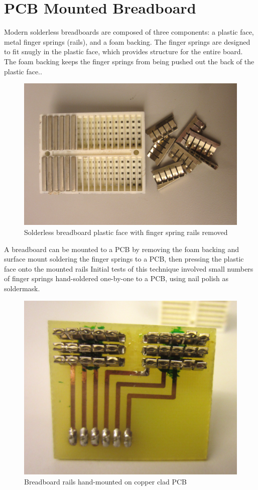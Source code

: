 \documentclass[11pt,twoside]{mitthesis}
\begin{document}
\section{PCB Mounted Breadboard}

Modern solderless breadboards are composed of three components: a plastic face, metal finger springs (rails), and a foam backing.
The finger springs are designed to fit snugly in the plastic face, which provides structure for the entire board.
The foam backing keeps the finger springs from being pushed out the back of the plastic face..

\begin{figure}[h!]
  \begin{center}
      \includegraphics[width=.6\textwidth]{../bb-rails2.png}
      \caption{Solderless breadboard plastic face with finger spring rails removed}
  \end{center}
\end{figure}

A breadboard can be mounted to a PCB by removing the foam backing and surface mount soldering the finger springs to a PCB, then pressing the plastic face onto the mounted rails
Initial tests of this technique involved small numbers of finger springs hand-soldered one-by-one to a PCB, using nail polish as soldermask.

\begin{figure}[H]
  \begin{center}
      \includegraphics[width=.8\textwidth]{../bb-proto-1.png}
      \caption{Breadboard rails hand-mounted on copper clad PCB}
  \end{center}
\end{figure}
\end{document}
